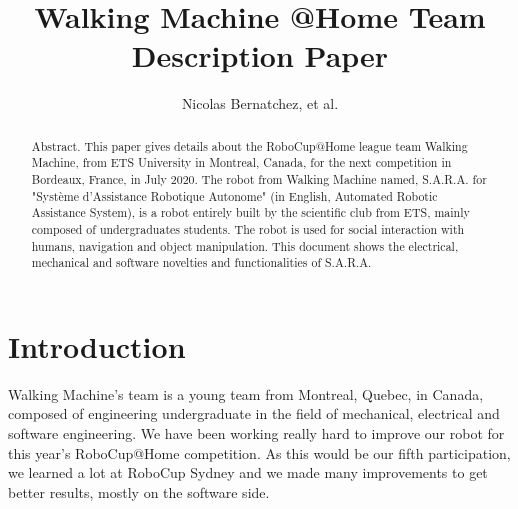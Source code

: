 \documentclass[runningheads,a4paper]{llncs}
\begin{document}
\newif\ifdraft
\draftfalse


\ifdraft
\setlength{\belowcaptionskip}{-5pt}
\fi

\title{Walking Machine @Home \newline {} Team Description Paper}

\author{Nicolas Bernatchez, et al.}
\maketitle


\begin{abstract}

Abstract. This paper gives details about the RoboCup@Home league
team Walking Machine, from ETS University in Montreal, Canada, for
the next competition in Bordeaux, France, in July 2020. The robot from Walking Machine named, S.A.R.A. for "Système d'Assistance Robotique Autonome" (in English, Automated Robotic Assistance System), is a robot entirely built by the scientific club from ETS, mainly composed of undergraduates students. The robot is used for social interaction with humans, navigation and object manipulation. This document shows the electrical, mechanical and software novelties and functionalities of S.A.R.A.

\end{abstract}


\section{Introduction}
\tab Walking Machine's team is a young team from Montreal, Quebec, in Canada, composed of engineering undergraduate in the field of mechanical, electrical and software engineering. We have been working really hard to improve our robot for this year's RoboCup@Home competition. As this would be our fifth participation, we learned a lot at RoboCup Sydney and we made many improvements to get better results, mostly on the software side. \\
\end{document}
